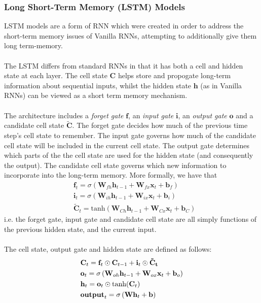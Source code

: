 \documentclass{article}
\theoremstyle{definition}
\begin{document}
\subsubsection{Long Short-Term Memory (LSTM) Models}
LSTM models are a form of RNN which were created in order to address the short-term memory issues of Vanilla RNNs, attempting to additionally give them long term-memory.
\\\\
The LSTM differs from standard RNNs in that it has both a cell and hidden state at each layer. The cell state $\mathbf{C}$ helps store and propogate long-term information about sequential inputs, whilst the hidden state $\mathbf{h}$ (as in Vanilla RNNs) can be viewed as a short term memory mechanism.
\\\\
The architecture includes a \textit{forget gate} $\textbf{f}$, an \textit{input gate} $\textbf{i}$, an \textit{output gate} $\textbf{o}$ and a candidate cell state \textit{$\mathbf{\tilde{C}}$}. The forget gate decides how much of the previous time step's cell state to remember. The input gate governs how much of the candidate cell state will be included in the current cell state. The output gate determines which parts of the the cell state are used for the hidden state (and consequently the output). The candidate cell state governs which new information to incorporate into the long-term memory. More formally, we have that 
\begin{align}
    &\mathbf{f}_t = \sigma\left(\mathbf{W}_{fh} \mathbf{h}_{t-1} + \mathbf{W}_{fx} \mathbf{x}_t + \mathbf{b}_{f}\right)\\
    &\mathbf{i}_t = \sigma\left(\mathbf{W}_{ih} \mathbf{h}_{t-1} + \mathbf{W}_{ix} \mathbf{x}_t + \mathbf{b}_{i}\right)\\
    &\mathbf{\tilde{C}}_t = \text{tanh}\left(\mathbf{W}_{Ch}\mathbf{h}_{t-1} + \mathbf{W}_{Cx} \mathbf{x}_t + \mathbf{b}_C\right) 
\end{align}
i.e. the forget gate, input gate and candidate cell state are all simply functions of the previous hidden state, and the current input.
\\\\
The cell state, output gate and hidden state are defined as follows:
\begin{align}
    &\mathbf{C}_t = \mathbf{f}_t \odot \mathbf{C}_{t-1} + \mathbf{i}_t \odot \mathbf{\tilde{C}_t}\\
    &\mathbf{o}_t = \sigma\left(\mathbf{W}_{oh} \mathbf{h}_{t-1} + \mathbf{W}_{ox} \mathbf{x}_t + \mathbf{b}_{o}\right)\\
    &\mathbf{h}_t = \mathbf{o}_t \odot \text{tanh}(\mathbf{C}_t)\\
    &\textbf{\text{output}}_t = \sigma\left(\mathbf{W} \mathbf{h}_t + \mathbf{b}\right)
\end{align}
\end{document}
